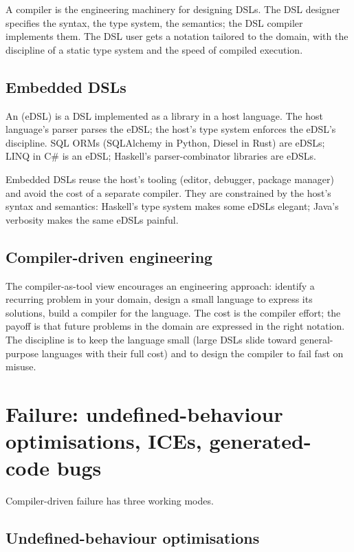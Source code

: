 A compiler is the engineering machinery for designing DSLs. The DSL designer specifies the syntax, the type system, the semantics; the DSL compiler implements them. The DSL user gets a notation tailored to the domain, with the discipline of a static type system and the speed of compiled execution.

\subsection{Embedded DSLs}

An  (eDSL) is a DSL implemented as a library in a host language. The host language's parser parses the eDSL; the host's type system enforces the eDSL's discipline. SQL ORMs (SQLAlchemy in Python, Diesel in Rust) are eDSLs; LINQ in C\# is an eDSL; Haskell's parser-combinator libraries are eDSLs.

Embedded DSLs reuse the host's tooling (editor, debugger, package manager) and avoid the cost of a separate compiler. They are constrained by the host's syntax and semantics: Haskell's type system makes some eDSLs elegant; Java's verbosity makes the same eDSLs painful.

\subsection{Compiler-driven engineering}

The compiler-as-tool view encourages an engineering approach: identify a recurring problem in your domain, design a small language to express its solutions, build a compiler for the language. The cost is the compiler effort; the payoff is that future problems in the domain are expressed in the right notation. The discipline is to keep the language small (large DSLs slide toward general-purpose languages with their full cost) and to design the compiler to fail fast on misuse.

\section{Failure: undefined-behaviour optimisations, ICEs, generated-code bugs}

Compiler-driven failure has three working modes.

\subsection{Undefined-behaviour optimisations}

